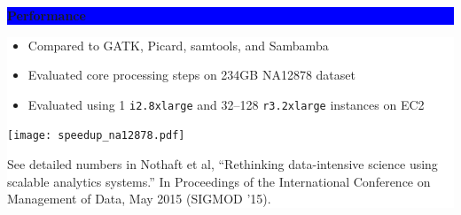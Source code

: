 \documentclass[11pt]{a0poster}
\begin{document}
{\begin{minipage}[t][2045pt][t]{\linewidth}
\begin{minipage}{0.3\linewidth}
\vspace{75pt}
\colorbox{Blue}{
\begin{minipage}{\linewidth}
\vspace{25pt}
\begin{center}
\Huge \bf \color{White} Performance
\end{center}
\vspace{10pt}
\end{minipage}
}
\colorbox{White}{
\begin{minipage}[t][1020pt][t]{\linewidth}
\color{Blue}
\vspace{20pt}
\LARGE
\begin{itemize}
\item Compared to GATK, Picard, samtools, and Sambamba
\item Evaluated core processing steps on 234GB NA12878 dataset
\item Evaluated using 1 \texttt{i2.8xlarge} and 32--128 \texttt{r3.2xlarge} instances on EC2
\end{itemize}
\begin{center}
\texttt{[image: speedup\_na12878.pdf]}
\end{center}
\small See detailed numbers in Nothaft et al, ``Rethinking data-intensive science using scalable analytics systems.''
In Proceedings of the International Conference on Management of Data, May 2015 (SIGMOD '15).
\pagebreak
\end{minipage}
}
\pagebreak
\end{minipage}
\begin{minipage}{0.03\linewidth}
\hfill
\pagebreak
\end{minipage}
\begin{minipage}{0.6\linewidth}


\end{minipage}
\end{minipage}}
\end{document}
